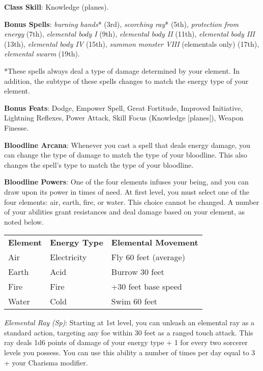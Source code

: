 \textbf{Class Skill}: Knowledge (planes).
				
\textbf{Bonus Spells}: \textit{burning hands}* (3rd), \textit{scorching ray}* (5th), \textit{protection from energy} (7th), \textit{elemental body I} (9th), \textit{elemental body II} (11th), \textit{elemental body III} (13th), \textit{elemental body IV} (15th), \textit{summon monster VIII} (elementals only) (17th), \textit{elemental swarm} (19th).
				
*These spells always deal a type of damage determined by your element. In addition, the subtype of these spells changes to match the energy type of your element.
				
\textbf{Bonus Feats}: Dodge, Empower Spell, Great Fortitude, Improved Initiative, Lightning Reflexes, Power Attack, Skill Focus (Knowledge \mbox{$[$}planes\mbox{$]$}), Weapon Finesse.
				
\textbf{Bloodline Arcana}: Whenever you cast a spell that deals energy damage, you can change the type of damage to match the type of your bloodline. This also changes the spell's type to match the type of your bloodline.
				
\textbf{Bloodline Powers}: One of the four elements infuses your being, and you can draw upon its power in times of need. At first level, you must select one of the four elements: air, earth, fire, or water. This choice cannot be changed. A number of your abilities grant resistances and deal damage based on your element, as noted below.
\begin{table}[]
\sffamily
\begin{tabular}{lll}
\textbf{Element} & \textbf{Energy Type} & \textbf{Elemental Movement} \\
Air & Electricity & Fly 60 feet (average)\\
Earth & Acid & Burrow 30 feet \\
Fire & Fire & +30 feet base speed \\
Water & Cold & Swim 60 feet \\
\end{tabular}
\end{table}
				
\textit{Elemental Ray} \textit{(Sp)}: Starting at 1st level, you can unleash an elemental ray as a standard action, targeting any foe within 30 feet as a ranged touch attack. This ray deals 1d6 points of damage of your energy type + 1 for every two sorcerer levels you possess. You can use this ability a number of times per day equal to 3 + your Charisma modifier.
				
